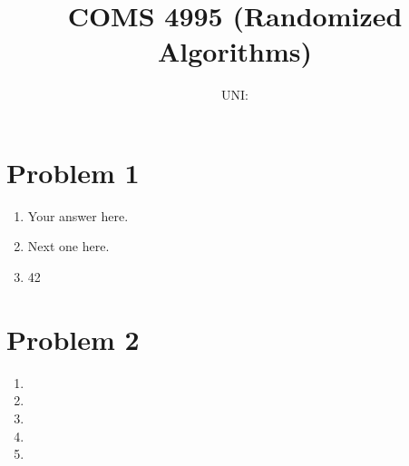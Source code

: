 \documentclass{article}
\title{COMS 4995 (Randomized Algorithms) \exerciseset}
\author{\studentname \qquad UNI: \suid}
\begin{document}
\maketitle

\section*{Problem 1}
\begin{enumerate}
\item %
Your answer here.

\item %
Next one here.

\item %
42

\end{enumerate}

\section*{Problem 2}
\begin{enumerate}
\item %

\item %

\item %

\item %

\item %

\end{enumerate}
\end{document}

